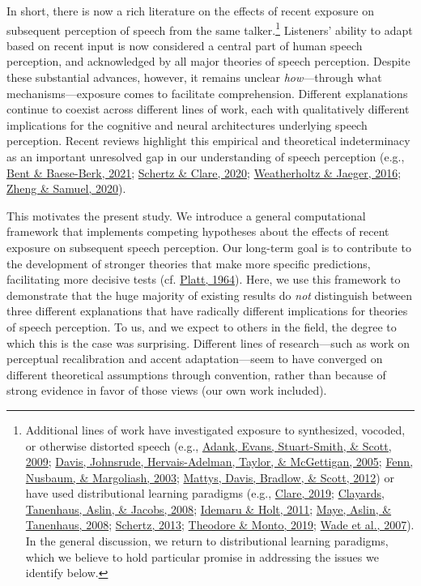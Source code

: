 \documentclass[
  11pt,
  english,
  man,floatsintext]{apa6}
\begin{document}
In short, there is now a rich literature on the effects of recent exposure on subsequent perception of speech from the same talker.\footnote{Additional lines of work have investigated exposure to synthesized, vocoded, or otherwise distorted speech (e.g., \protect\hyperlink{ref-adank2009}{Adank, Evans, Stuart-Smith, \& Scott, 2009}; \protect\hyperlink{ref-davis2005}{Davis, Johnsrude, Hervais-Adelman, Taylor, \& McGettigan, 2005}; \protect\hyperlink{ref-fenn2003}{Fenn, Nusbaum, \& Margoliash, 2003}; \protect\hyperlink{ref-mattys2012}{Mattys, Davis, Bradlow, \& Scott, 2012}) or have used distributional learning paradigms (e.g., \protect\hyperlink{ref-clare2019}{Clare, 2019}; \protect\hyperlink{ref-clayards2008}{Clayards, Tanenhaus, Aslin, \& Jacobs, 2008}; \protect\hyperlink{ref-idemaru-holt2011}{Idemaru \& Holt, 2011}; \protect\hyperlink{ref-maye2008}{Maye, Aslin, \& Tanenhaus, 2008}; \protect\hyperlink{ref-schertz2013}{Schertz, 2013}; \protect\hyperlink{ref-theodore-monto2019}{Theodore \& Monto, 2019}; \protect\hyperlink{ref-wade2007}{Wade et al., 2007}). In the general discussion, we return to distributional learning paradigms, which we believe to hold particular promise in addressing the issues we identify below.} Listeners' ability to adapt based on recent input is now considered a central part of human speech perception, and acknowledged by all major theories of speech perception. Despite these substantial advances, however, it remains unclear \emph{how}---through what mechanisms---exposure comes to facilitate comprehension. Different explanations continue to coexist across different lines of work, each with qualitatively different implications for the cognitive and neural architectures underlying speech perception. Recent reviews highlight this empirical and theoretical indeterminacy as an important unresolved gap in our understanding of speech perception (e.g., \protect\hyperlink{ref-bent-baeseberk2021}{Bent \& Baese-Berk, 2021}; \protect\hyperlink{ref-schertz-clare2020}{Schertz \& Clare, 2020}; \protect\hyperlink{ref-weatherholtz-jaeger2016}{Weatherholtz \& Jaeger, 2016}; \protect\hyperlink{ref-zheng-samuel2020}{Zheng \& Samuel, 2020}).

This motivates the present study. We introduce a general computational framework that implements competing hypotheses about the effects of recent exposure on subsequent speech perception. Our long-term goal is to contribute to the development of stronger theories that make more specific predictions, facilitating more decisive tests (cf. \protect\hyperlink{ref-platt1964}{Platt, 1964}). Here, we use this framework to demonstrate that the huge majority of existing results do \emph{not} distinguish between three different explanations that have radically different implications for theories of speech perception. To us, and we expect to others in the field, the degree to which this is the case was surprising. Different lines of research---such as work on perceptual recalibration and accent adaptation---seem to have converged on different theoretical assumptions through convention, rather than because of strong evidence in favor of those views (our own work included).
\end{document}
